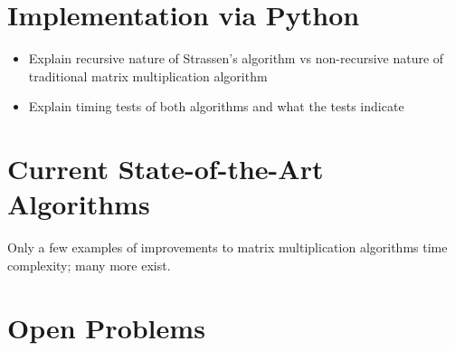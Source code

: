 \documentclass{article}
\begin{document}
\section{Implementation via Python}
    \begin{itemize}
        \item Explain recursive nature of Strassen's algorithm vs non-recursive nature of traditional matrix multiplication algorithm
        \item Explain timing tests of both algorithms and what the tests indicate
    \end{itemize}


\section{Current State-of-the-Art Algorithms}
    Only a few examples of improvements to matrix multiplication algorithms time complexity; many more exist.

\section{Open Problems}
    
\end{document}
